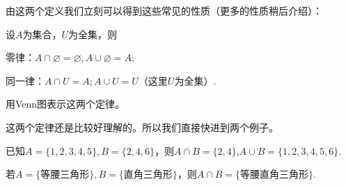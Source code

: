 \documentclass[lang=cn,math=cm,chinesefont=nofont,11pt,scheme=chinese,onecol]{elegantbook}
\begin{document}
由这两个定义我们立刻可以得到这些常见的性质（更多的性质稍后介绍）：

设$A$为集合，$U$为全集，则
\begin{property}
  零律：$A\cap\varnothing =\varnothing,A\cup\varnothing=A$;
\end{property}
\begin{property}
  同一律：$A\cap U=A;A\cup U=U$（这里$U$为全集）.
\end{property}

\begin{exercise}\label{exer:10}
  用Venn图表示这两个定律。
\end{exercise}


这两个定律还是比较好理解的。所以我们直接快进到两个例子。

\begin{example}
  已知$A=\{1,2,3,4,5\},B=\{2,4,6\}$，则$A\cap B=\{2,4\}$,$A\cup B=\{1,2,3,4,5,6\}$.
\end{example}

\begin{example}
  若$A=\{\text{等腰三角形}\},B=\{\text{直角三角形}\}$，则$A\cap B=\{\text{等腰直角三角形}\}.$
\end{example}
\end{document}

